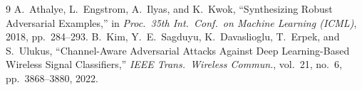 \documentclass[11pt]{article}
\begin{document}
\begin{thebibliography}{9}
 A.~Athalye, L.~Engstrom, A.~Ilyas, and K.~Kwok,
``Synthesizing Robust Adversarial Examples,'' in \emph{Proc.\ 35th Int.\ Conf.\ on
Machine Learning (ICML)}, 2018, pp.~284--293.
 B.~Kim, Y.~E.~Sagduyu, K.~Davaslioglu, T.~Erpek, and S.~Ulukus,
``Channel-Aware Adversarial Attacks Against Deep Learning-Based Wireless Signal
Classifiers,'' \emph{IEEE Trans.\ Wireless Commun.}, vol.~21, no.~6, pp.~3868--3880, 2022.
\end{thebibliography}
\end{document}
